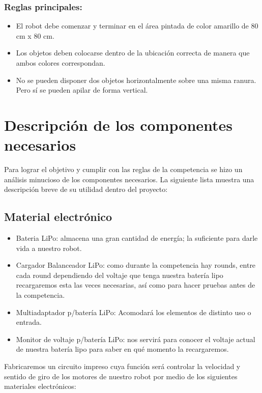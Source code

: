 \documentclass{article}
\begin{document}
\subsubsection{Reglas principales: }

\begin{itemize}
    \item El robot debe comenzar y terminar en el área pintada de color amarillo de 80 cm x 80 cm.
    \item Los objetos deben colocarse dentro de la ubicación correcta de manera que ambos colores correspondan.
    \item No se pueden disponer dos objetos horizontalmente sobre una misma ranura. Pero sí se pueden apilar de forma vertical.
\end{itemize}

\section{Descripción de los componentes necesarios}

Para lograr el objetivo y cumplir con las reglas de la competencia se hizo un análisis minucioso de los componentes necesarios. La siguiente lista muestra una descripción breve de su utilidad dentro del proyecto:

\subsection{Material electrónico}

\begin{itemize}
    \item Bateria LiPo: almacena una gran cantidad de energía; la suficiente para darle vida a nuestro robot.
    \item Cargador Balanceador LiPo: como durante la competencia hay rounds, entre cada round dependiendo del voltaje que tenga nuestra batería lipo recargaremos esta las veces necesarias, así como para hacer pruebas antes de la competencia.
    \item Multiadaptador p/batería LiPo: Acomodará los elementos de distinto uso o entrada.
    \item Monitor de voltaje p/batería LiPo: nos servirá para conocer el voltaje actual de nuestra batería lipo para saber en qué momento la recargaremos.
\end{itemize}

Fabricaremos un circuito impreso cuya función será controlar la velocidad y sentido de giro de los motores de nuestro robot por medio de los siguientes materiales electrónicos:
\end{document}
